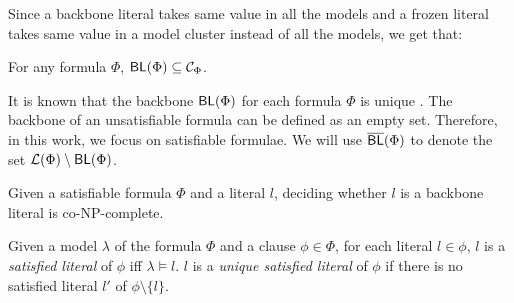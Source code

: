 Since a backbone literal takes same value in all the models and a frozen literal takes same value in a model cluster instead of all the models,
we get that:

\begin{proposition}\label{Frozen-backbone}
For any formula $\Phi$, $\textsf{BL}(\Phi)\subseteq\mathcal{C}_\Phi$.
\end{proposition}


It is known that the backbone $\textsf{BL}(\Phi)$ for each formula $\Phi$ is unique \cite{JLM15}.
The backbone of an unsatisfiable formula can be defined as an empty set. Therefore, in this work, we focus on satisfiable formulae.
We will use $\overline{\textsf{BL}}(\Phi)$ to denote the set
${\cal L}(\Phi)\setminus \textsf{BL}(\Phi)$.

\begin{theorem}
\label{thm:co-NP}\cite{Jan10}
Given a satisfiable formula $\Phi$ and a literal $l$, deciding whether $l$ is a backbone literal is co-NP-complete.
\end{theorem}


\begin{definition}
Given a model $\lambda$ of the formula $\Phi$ and a clause $\phi\in\Phi$, for each literal $l\in\phi$, $l$ is a \emph{satisfied literal}
of $\phi$ iff $\lambda\models l$. $l$ is a \emph{unique satisfied literal} of $\phi$ if there is no satisfied literal $l'$ of $\phi\setminus\{l\}$.
\end{definition}



